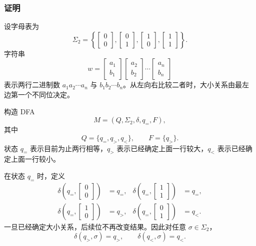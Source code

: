 \begin{answerred}
\subsubsection*{证明}

设字母表为
\[
    \Sigma_2=
    \left\{
    \begin{bmatrix}0\\0\end{bmatrix},
    \begin{bmatrix}0\\1\end{bmatrix},
    \begin{bmatrix}1\\0\end{bmatrix},
    \begin{bmatrix}1\\1\end{bmatrix}
    \right\}.
\]
字符串
\[
    w=
    \begin{bmatrix}a_1\\ b_1\end{bmatrix}
    \begin{bmatrix}a_2\\ b_2\end{bmatrix}
    \cdots
    \begin{bmatrix}a_n\\ b_n\end{bmatrix}
\]
表示两行二进制数 $a_1a_2\cdots a_n$ 与 $b_1b_2\cdots b_n$。从左向右比较二者时，大小关系由最左边第一个不同位决定。

构造 DFA
\[
    M=(Q,\Sigma_2,\delta,q_=,F),
\]
其中
\[
    Q=\{q_=,q_>,q_<\},\qquad F=\{q_>\}.
\]
状态 $q_=$ 表示目前为止两行相等，$q_>$ 表示已经确定上面一行较大，$q_<$ 表示已经确定上面一行较小。

在状态 $q_=$ 时，定义
\[
\begin{aligned}
    \delta\left(q_=,\begin{bmatrix}0\\0\end{bmatrix}\right)&=q_=,
    &
    \delta\left(q_=,\begin{bmatrix}1\\1\end{bmatrix}\right)&=q_=,\\
    \delta\left(q_=,\begin{bmatrix}1\\0\end{bmatrix}\right)&=q_>,
    &
    \delta\left(q_=,\begin{bmatrix}0\\1\end{bmatrix}\right)&=q_<.
\end{aligned}
\]
一旦已经确定大小关系，后续位不再改变结果。因此对任意 $\sigma\in\Sigma_2$，
\[
    \delta(q_>,\sigma)=q_>,
    \qquad
    \delta(q_<,\sigma)=q_<.
\]


\end{answerred}
